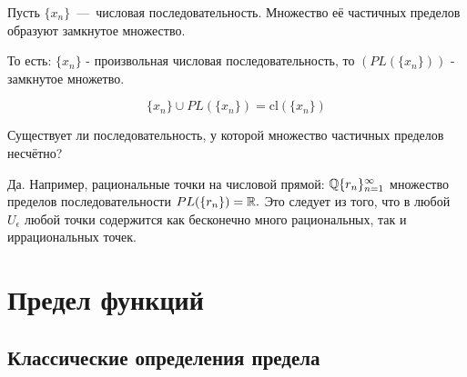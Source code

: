 \begin{proposition}
    Пусть $\{ x_{n} \}$~---~числовая последовательность. Множество её частичных пределов образуют замкнутое множество.
    
    То есть: 
    $\{ x_{n} \}$ - произвольная числовая последовательность, то $(PL(\{ x_{n} \}))$ - замкнутое множетво.
    
\[\{ x_{n} \} \cup PL(\{ x_{n} \}) = \text{cl}(\{ x_{n} \})
\]
\end{proposition}

\begin{problem}
    Существует ли последовательность, у которой множество частичных пределов несчётно?
\end{problem}

\begin{solution}
    Да. Например, рациональные точки на числовой прямой: $\mathbb{Q} \{ r_{n} \}_{n=1}^{\infty}$ множество пределов последовательности $PL(\{ r_{n} \}) = \mathbb{R}.$ Это следует из того, что в любой $U_{\epsilon}$ любой точки содержится как бесконечно много рациональных, так и иррациональных точек.
\end{solution}

\section{Предел функций}

\subsection{Классические определения предела}

